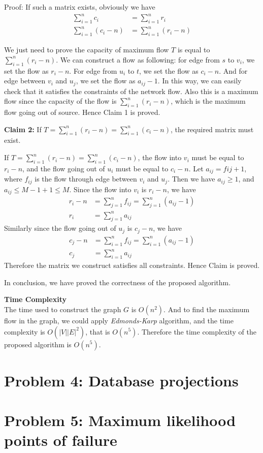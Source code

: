 \documentclass{article}
\newcommand{\Complexity}{\vspace{0.3cm} \noindent\textbf{Time Complexity} \\}
\begin{document}
Proof: If such a matrix exists, obviously we have 
\begin{align}
  \sum_{i=1}^{n}c_i &= \sum_{i=1}^{n}r_i \\
  \sum_{i=1}^{n}(c_i -n) &= \sum_{i=1}^{n}(r_i - n)  
\end{align}

We just need to prove the capacity of maximum flow $T$ is equal to $ \sum_{i=1}^{n}(r_i -n)$.
We can construct a flow as following: for edge from $s$ to $v_i$, we set the flow as $r_i - n$.     
For edge from $u_i$ to $t$, we set the flow as $c_i - n$. And for edge between $v_i$ and $u_j$, we
set the flow as $a_{ij} - 1$. In this way, we can easily check that it satisfies the constraints of
the network flow. Also this is a maximum flow since the capacity of the flow is $\sum_{i=1}^{n}(r_i
- n)$, which is the maximum flow going out of source. Hence Claim 1 is proved.

\textbf{Claim 2:} If $T = \sum_{i=1}^{n} (r_i - n) = \sum_{i=1}^{n}(c_i - n)$, the required
matrix must exist.

If $T = \sum_{i=1}^{n} (r_i - n) = \sum_{i=1}^{n}(c_i -n)$, the flow into $v_i$ must be equal to
$r_i - n$, and the flow going out of $u_i$ must be equal to $c_i - n$. 
Let $a_{ij} = f{ij} + 1$, where $f_{ij}$ is the flow through edge between $v_i$ and $u_j$. Then we
have $a_{ij} \geq 1$, and $a_{ij} \leq M-1 + 1 \leq M$. Since the flow into $v_i$ is $r_i - n$, we
have
\begin{align}
  r_i - n &= \sum_{j=1}^{n}f_{ij} = \sum_{j=1}^{n}(a_{ij} - 1) \\
  r_i &= \sum_{j=1}^{n}a_{ij} 
\end{align}
Similarly since the flow going out of $u_j$ is $c_j - n$, we have 
\begin{align}
  c_j - n &= \sum_{i=1}^{n}f_{ij} = \sum_{i=1}^{n}(a_{ij} - 1) \\
  c_j &= \sum_{i=1}^{n}a_{ij} 
\end{align}
Therefore the matrix we construct satisfies all constraints. Hence Claim is proved.

In conclusion, we have proved the correctness of the proposed algorithm.

\Complexity
The time used to construct the graph $G$ is $O(n^2)$. And to find the maximum flow in the graph, we
could apply \textit{Edmonds-Karp} algorithm, and the time complexity is $O(|V||E|^2)$, that is
$O(n^5)$. Therefore the time complexity of the proposed algorithm is $O(n^5)$.

\section*{Problem 4: Database projections}

\section*{Problem 5: Maximum likelihood points of failure}
\end{document}
